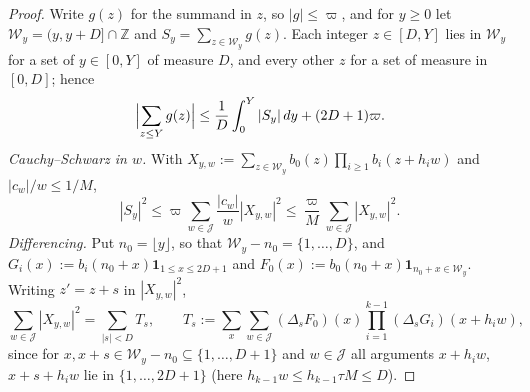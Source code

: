 \begin{proof}
Write $g(z)$ for the summand in $z$, so $|g|\le\varpi$, and for $y\ge0$ let $\mathcal W_y=(y,y+D]\cap\mathbb Z$ and $S_y=\sum_{z\in\mathcal W_y}g(z)$. Each integer $z\in[D,Y]$ lies in $\mathcal W_y$ for a set of $y\in[0,Y]$ of measure $D$, and every other $z$ for a set of measure in $[0,D]$; hence
\begin{equation}
\Bigl|\sum_{z\le Y}g(z)\Bigr|\le\frac1D\int_0^Y|S_y|\,dy+(2D+1)\varpi .
\label{eq:windows}
\end{equation}
\emph{Cauchy--Schwarz in $w$.} With $X_{y,w}:=\sum_{z\in\mathcal W_y}b_0(z)\prod_{i\ge1}b_i(z+h_iw)$ and $|c_w|/w\le1/M$,
\begin{equation}
|S_y|^2\le\varpi\sum_{w\in\mathcal J}\frac{|c_w|}{w}|X_{y,w}|^2\le\frac{\varpi}{M}\sum_{w\in\mathcal J}|X_{y,w}|^2 .
\label{eq:cs_w}
\end{equation}
\emph{Differencing.} Put $n_0=\lfloor y\rfloor$, so that $\mathcal W_y-n_0=\{1,\dots,D\}$, and $G_i(x):=b_i(n_0+x)\mathbf 1_{1\le x\le 2D+1}$ and $F_0(x):=b_0(n_0+x)\mathbf 1_{n_0+x\in\mathcal W_y}$. Writing $z'=z+s$ in $|X_{y,w}|^2$,
\begin{equation}
\sum_{w\in\mathcal J}|X_{y,w}|^2=\sum_{|s|<D}T_s,\qquad T_s:=\sum_{x}\sum_{w\in\mathcal J}(\Delta_sF_0)(x)\prod_{i=1}^{k-1}(\Delta_sG_i)(x+h_iw),
\label{eq:Tk}
\end{equation}
since for $x,x+s\in\mathcal W_y-n_0\subseteq\{1,\dots,D+1\}$ and $w\in\mathcal J$ all arguments $x+h_iw$, $x+s+h_iw$ lie in $\{1,\dots,2D+1\}$ (here $h_{k-1}w\le h_{k-1}\tau M\le D$).


\end{proof}
